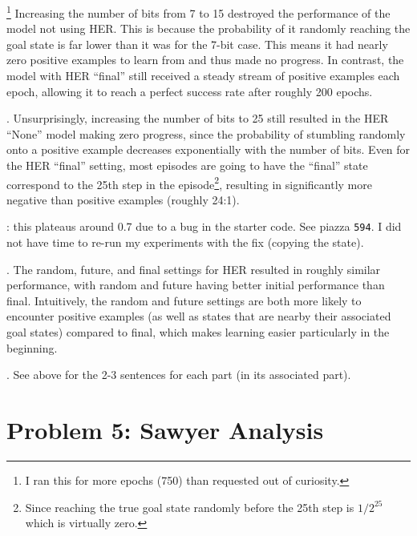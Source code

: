 \documentclass[11pt]{article}
\begin{document}
\clearpage
{}\footnote{I ran this for more epochs (750) than requested out of curiosity. } Increasing the number of bits from 7 to 15 destroyed the performance of the model not using HER. This is because the probability of it randomly reaching the goal state is far lower than it was for the 7-bit case. This means it had nearly zero positive examples to learn from and thus made no progress. In contrast, the model with HER ``final'' still received a steady stream of positive examples each epoch, allowing it to reach a perfect success rate after roughly 200 epochs. 



{}
. Unsurprisingly, increasing the number of bits to 25 still resulted in the HER ``None'' model making zero progress, since the probability of stumbling randomly onto a positive example decreases exponentially with the number of bits. Even for the HER ``final'' setting, most episodes are going to have the ``final'' state correspond to the 25th step in the episode\footnote{Since reaching the true goal state randomly before the 25th step is $1/2^{25}$ which is virtually zero.}, resulting in significantly more negative than positive examples (roughly 24:1). 


: this plateaus around 0.7 due to a bug in the starter code. See piazza \texttt{\@594}. I did not have time to re-run my experiments with the fix (copying the state). 

{}
. The random, future, and final settings for HER resulted in roughly similar performance, with random and future having better initial performance than final. Intuitively, the random and future settings are both more likely to encounter positive examples (as well as states that are nearby their associated goal states) compared to final, which makes learning easier particularly in the beginning. 



. See above for the 2-3 sentences for each part (in its associated part). 










\clearpage


\section*{Problem 5: Sawyer Analysis}
\end{document}
